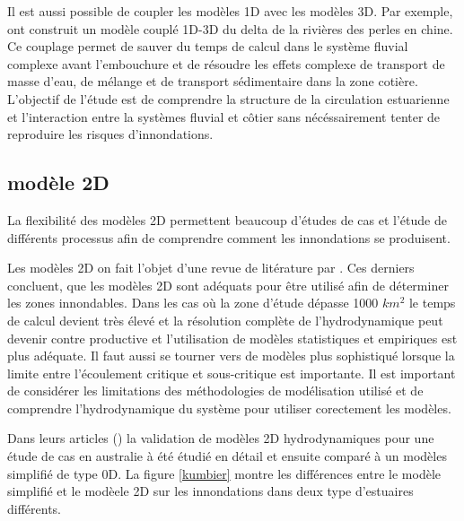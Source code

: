 \documentclass[12pt]{article}   %
\begin{document}
    Il est aussi possible de coupler les modèles 1D avec les modèles 3D. Par exemple,\cite{Twigt2009} ont construit un modèle couplé 1D-3D du delta de la rivières des perles en chine. Ce couplage permet de sauver du temps de calcul dans le système fluvial complexe avant l'embouchure et de résoudre les effets complexe de transport de masse d'eau, de mélange et de transport sédimentaire dans la zone cotière. L'objectif de l'étude est de comprendre la structure de la circulation estuarienne et l'interaction entre la systèmes fluvial et côtier sans nécéssairement tenter de reproduire les risques d'innondations. 
    
    \subsection{modèle 2D}
    
    La flexibilité des modèles 2D permettent beaucoup d'études de cas et l'étude de différents processus afin de comprendre comment les innondations se produisent. 

    Les modèles 2D  on fait l'objet d'une revue de litérature par \cite{Neelz2013}. Ces derniers concluent, que les modèles 2D sont adéquats pour être utilisé afin de déterminer les zones innondables. Dans les cas où la zone d'étude dépasse 1000 $km^2$ le temps de calcul devient très élevé et la résolution complète de l'hydrodynamique peut devenir contre productive et l'utilisation de modèles statistiques et empiriques est plus adéquate. Il faut aussi se tourner vers de modèles plus sophistiqué lorsque la limite entre l'écoulement critique et sous-critique est importante.  Il est important de considérer les limitations des méthodologies de modélisation utilisé et de comprendre l'hydrodynamique du système pour utiliser corectement les modèles.
    
    Dans leurs articles (\cite{Kumbier2018,Kumbier2019}) la validation de modèles 2D hydrodynamiques pour une étude de cas en australie à été étudié en détail et ensuite comparé à un modèles simplifié de type 0D. La figure \ref{kumbier} montre les différences entre le modèle simplifié et le modèele 2D sur les innondations dans deux type d'estuaires différents. 
    
\end{document}
